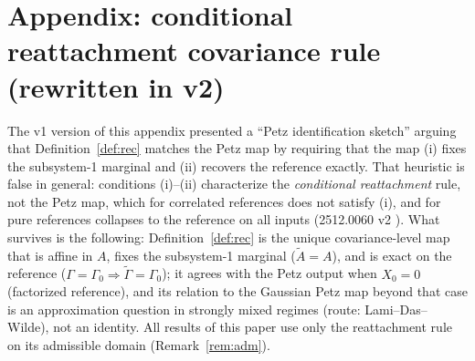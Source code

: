 \documentclass[11pt]{article}
\theoremstyle{remark}
\begin{document}
\section{Appendix: conditional reattachment covariance rule (rewritten in v2)}
The v1 version of this appendix presented a ``Petz identification sketch''
arguing that Definition~\ref{def:rec} matches the Petz map by requiring
that the map (i) fixes the subsystem-1 marginal and (ii) recovers the
reference exactly. That heuristic is false in general: conditions (i)--(ii)
characterize the \emph{conditional reattachment} rule, not the Petz map,
which for correlated references does not satisfy (i), and for pure
references collapses to the reference on all inputs (2512.0060 v2
\cite{S0060}). What survives is the following: Definition~\ref{def:rec} is
the unique covariance-level map that is affine in $A$, fixes the
subsystem-1 marginal ($\tilde A = A$), and is exact on the reference
($\Gamma = \Gamma_0 \Rightarrow \tilde\Gamma = \Gamma_0$); it agrees
with the Petz output when $X_0 = 0$ (factorized reference), and its
relation to the Gaussian Petz map beyond that case is an approximation
question in strongly mixed regimes (route: Lami--Das--Wilde), not an
identity. All results of this paper use only the reattachment rule on its
admissible domain (Remark~\ref{rem:adm}).
\end{document}
